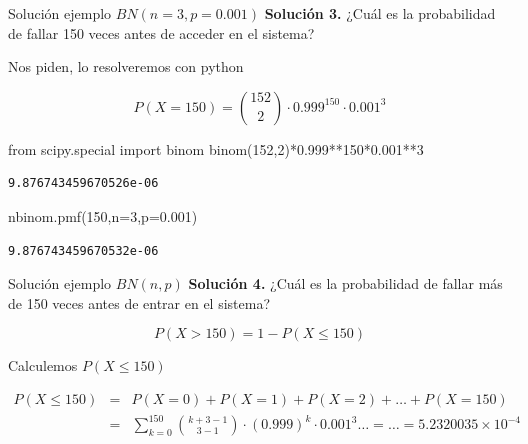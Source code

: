 \documentclass[
  ignorenonframetext,
  aspectratio=169]{beamer}
\newenvironment{Shaded}{\begin{snugshade}}{\end{snugshade}}
\newcommand{\DecValTok}[1]{\textcolor[rgb]{0.68,0.00,0.00}{#1}}
\newcommand{\FloatTok}[1]{\textcolor[rgb]{0.68,0.00,0.00}{#1}}
\newcommand{\ImportTok}[1]{\textcolor[rgb]{0.00,0.46,0.62}{#1}}
\newcommand{\NormalTok}[1]{\textcolor[rgb]{0.00,0.23,0.31}{#1}}
\newcommand{\OperatorTok}[1]{\textcolor[rgb]{0.37,0.37,0.37}{#1}}
\begin{document}
\begin{frame}[fragile]{Solución ejemplo \(BN(n=3,p=0.001)\)}
\protect\hypertarget{soluciuxf3n-ejemplo-bnn3p0.001-1}{}
\textbf{Solución 3.} ¿Cuál es la probabilidad de fallar 150 veces antes
de acceder en el sistema?

Nos piden, lo resolveremos con python

\[
P(X=150)= {152\choose 2} \cdot 0.999^{150}\cdot 0.001^3
\]

\begin{Shaded}
\begin{Highlighting}[]
\ImportTok{from}\NormalTok{  scipy.special }\ImportTok{import}\NormalTok{ binom}
\NormalTok{binom(}\DecValTok{152}\NormalTok{,}\DecValTok{2}\NormalTok{)}\OperatorTok{*}\FloatTok{0.999}\OperatorTok{**}\DecValTok{150}\OperatorTok{*}\FloatTok{0.001}\OperatorTok{**}\DecValTok{3}
\end{Highlighting}
\end{Shaded}

\begin{verbatim}
9.876743459670526e-06
\end{verbatim}

\begin{Shaded}
\begin{Highlighting}[]
\NormalTok{nbinom.pmf(}\DecValTok{150}\NormalTok{,n}\OperatorTok{=}\DecValTok{3}\NormalTok{,p}\OperatorTok{=}\FloatTok{0.001}\NormalTok{)}
\end{Highlighting}
\end{Shaded}

\begin{verbatim}
9.876743459670532e-06
\end{verbatim}
\end{frame}

\begin{frame}{Solución ejemplo \(BN(n,p)\)}
\protect\hypertarget{soluciuxf3n-ejemplo-bnnp}{}
\textbf{Solución 4.} ¿Cuál es la probabilidad de fallar más de 150 veces
antes de entrar en el sistema?

\[P(X>150)=1-P(X\leq 150)\]

Calculemos \(P(X\leq 150)\)

\begin{eqnarray*}
P(X\leq 150) &=& P(X=0)+P(X=1)+P(X=2)+\ldots+P(X=150)\\
&=& \sum_{k=0}^{150} {k+3-1\choose 3-1} \cdot (0.999)^{k}\cdot 0.001^3\ldots = \ldots =\ensuremath{5.2320035\times 10^{-4}}
\end{eqnarray*}
\end{frame}
\end{document}

